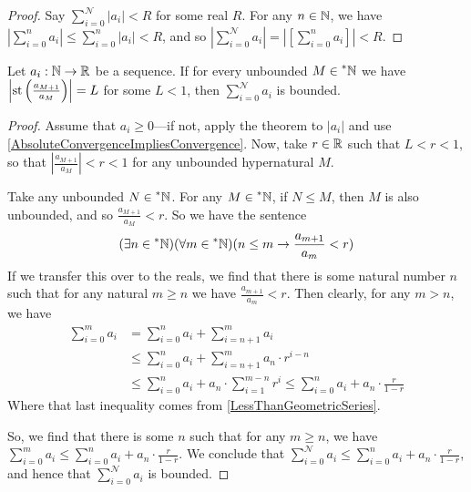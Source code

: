 \begin{proof}
    Say $\sum_{i = 0}^\mathcal{N} |a_i| < R$ for some real $R$. For any $n \in \mathbb{N}$, we have $\left|\sum_{i = 0}^n a_i\right| \leq \sum_{i = 0}^n |a_i| < R$, and so $\left|\sum_{i = 0}^\mathcal{N} a_i\right| = \left|[\sum_{i=0}^n a_i]\right| < R$.
\end{proof}

\begin{thm}\label{RatioTest}
    Let $a_i: \mathbb{N} \to \mathbb{R}$ be a sequence. If for every unbounded $M \in \prescript{*}{}{\mathbb{N}}$ we have $\left|\operatorname{st}\left(\frac{a_{M+1}}{a_M}\right)\right| = L$ for some $L < 1$, then $\sum_{i=0}^\mathcal{N} a_i$ is bounded.
\end{thm}

\begin{proof}
    Assume that $a_i \geq 0$---if not, apply the theorem to $|a_i|$ and use \ref{AbsoluteConvergenceImpliesConvergence}. Now, take $r \in \mathbb{R}$ such that $L < r < 1$, so that $\left|\frac{a_{M+1}}{a_M}\right| < r < 1$ for any unbounded hypernatural $M$.

    Take any unbounded $N \in \prescript{*}{}{\mathbb{N}}$. For any $M \in \prescript{*}{}{\mathbb{N}}$, if $N \leq M$, then $M$ is also unbounded, and so $\frac{a_{M+1}}{a_M} < r$. So we have the sentence
    \[ (\exists n \in \prescript{*}{}{\mathbb{N}})(\forall m \in \prescript{*}{}{\mathbb{N}})(n \leq m \to \frac{a_{m+1}}{a_m} < r) \]
    If we transfer this over to the reals, we find that there is some natural number $n$ such that for any natural $m \geq n$ we have $\frac{a_{m+1}}{a_m} < r$. Then clearly, for any $m > n$, we have 
    \begin{align*}
    \sum_{i = 0}^m a_i &= \sum_{i = 0}^n a_i + \sum_{i = n+1}^m a_i \\
        &\leq \sum_{i = 0}^n a_i + \sum_{i = n+1}^m a_n \cdot r^{i - n} \\
        &\leq \sum_{i = 0}^n a_i + a_n \cdot \sum_{i = 1}^{m-n}  r^{i} \leq \sum_{i = 0}^n a_i + a_n \cdot \frac{r}{1-r}
    \end{align*}
    Where that last inequality comes from \ref{LessThanGeometricSeries}.

    So, we find that there is some $n$ such that for any $m \geq n$, we have $\sum_{i = 0}^m a_i \leq \sum_{i = 0}^n a_i + a_n \cdot \frac{r}{1-r}$. We conclude that $\sum_{i = 0}^\mathcal{N} a_i \leq \sum_{i = 0}^n a_i + a_n \cdot \frac{r}{1-r}$, and hence that $\sum_{i = 0}^\mathcal{N} a_i$ is bounded.

\end{proof}